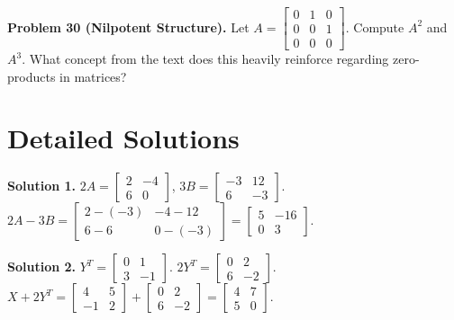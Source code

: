 \documentclass[11pt]{article}
\begin{document}
\noindent \textbf{Problem 30 (Nilpotent Structure).} Let $A = \begin{bmatrix} 0 & 1 & 0 \\ 0 & 0 & 1 \\ 0 & 0 & 0 \end{bmatrix}$. Compute $A^2$ and $A^3$. What concept from the text does this heavily reinforce regarding zero-products in matrices?

\newpage
\section{Detailed Solutions}

\textbf{Solution 1.} 
$2A = \begin{bmatrix} 2 & -4 \\ 6 & 0 \end{bmatrix}$, $3B = \begin{bmatrix} -3 & 12 \\ 6 & -3 \end{bmatrix}$.\\
$2A - 3B = \begin{bmatrix} 2 - (-3) & -4 - 12 \\ 6 - 6 & 0 - (-3) \end{bmatrix} = \begin{bmatrix} 5 & -16 \\ 0 & 3 \end{bmatrix}$.

\vspace{0.2cm}\noindent\textbf{Solution 2.}
$Y^T = \begin{bmatrix} 0 & 1 \\ 3 & -1 \end{bmatrix}$. $2Y^T = \begin{bmatrix} 0 & 2 \\ 6 & -2 \end{bmatrix}$.\\
$X + 2Y^T = \begin{bmatrix} 4 & 5 \\ -1 & 2 \end{bmatrix} + \begin{bmatrix} 0 & 2 \\ 6 & -2 \end{bmatrix} = \begin{bmatrix} 4 & 7 \\ 5 & 0 \end{bmatrix}$.
\end{document}
